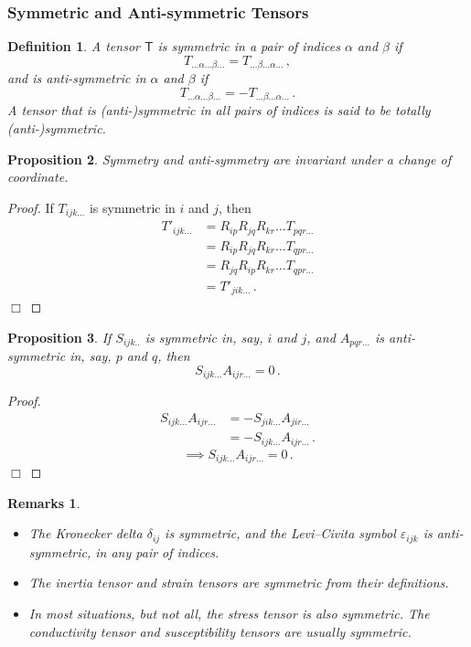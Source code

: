 \documentclass{article}
\theoremstyle{plain}\theoremheaderfont{\normalfont\itshape}\theorembodyfont{\rmfamily}\theoremseparator{.}\newtheorem*{rem}{Remark}\newtheorem*{ex}{Example}\newtheorem*{proof}{Proof}\newtheorem*{altp}{Alternative proof}
\theoremstyle{plain}\theoremheaderfont{\normalfont\bfseries}\theorembodyfont{\rmfamily}\theoremseparator{.}\newtheorem{thm}{Theorem}[section]\newtheorem{lem}[thm]{Lemma}\newtheorem{prop}[thm]{Proposition}\newtheorem*{cor}{Corollary}\newtheorem{defn}[thm]{Definition}\newtheorem{clm}[thm]{Claim}\newtheorem{clminproof}{Claim}
\theoremstyle{break}\theoremheaderfont{\normalfont\itshape}\theorembodyfont{\rmfamily}\theoremseparator{.\medskip}\newtheorem*{proofskip}{Proof}\newtheorem*{exs}{Examples}\newtheorem*{rems}{Remarks}
\theoremstyle{break}\theoremheaderfont{\normalfont\bfseries}\theorembodyfont{\rmfamily}\theoremseparator{.\medskip}\newtheorem{lemskip}[thm]{Lemma}\newtheorem{defnskip}[thm]{Definition}\newtheorem{propskip}[thm]{Proposition}\newtheorem{thmskip}[thm]{Theorem}
\numberwithin{equation}{section}
\newcommand{\qed}{\hfill\ensuremath{\Box}}
\begin{document}
	\subsubsection{Symmetric and Anti-symmetric Tensors}
	\begin{defn}
		A tensor \(\mathsf{T}\) is \textit{symmetric} in a pair of indices \(\alpha\) and \(\beta\) if
		\[T_{\dots\alpha\dots\beta\dots}=T_{\dots\beta\dots\alpha\dots}\,,\]
		and is \textit{anti-symmetric} in \(\alpha\) and \(\beta\) if
		\[T_{\dots\alpha\dots\beta\dots}=-T_{\dots\beta\dots\alpha\dots}\,.\]
		A tensor that is (anti-)symmetric in all pairs of indices is said to be \textit{totally (anti-)symmetric}.
	\end{defn}
	\begin{prop}
		Symmetry and anti-symmetry are invariant under a change of coordinate.
	\end{prop}
	\begin{proof}
		If \(T_{ijk\dots}\) is symmetric in \(i\) and \(j\), then
		\begin{align*}
			T'_{ijk\dots}&=R_{ip}R_{jq}R_{kr}\dots T_{pqr\dots}\\
			&=R_{ip}R_{jq}R_{kr}\dots T_{qpr\dots}\\
			&=R_{jq}R_{ip}R_{kr}\dots T_{qpr\dots}\\
			&=T'_{jik\dots}\,.
		\end{align*}\qed
	\end{proof}
	\begin{prop}
		If \(S_{ijk..}\) is symmetric in, say, \(i\) and \(j\), and \(A_{pqr\dots}\) is anti-symmetric in, say, \(p\) and \(q\), then
		\[S_{ijk\dots}A_{ijr\dots}=0\,.\]
	\end{prop}
	\begin{proof}
		\begin{align*}
			S_{ijk\dots}A_{ijr\dots}&=-S_{jik\dots}A_{jir\dots}\\
			&=-S_{ijk\dots}A_{ijr\dots}\,.
		\end{align*}
		\[\implies S_{ijk\dots}A_{ijr\dots}=0\,.\]\qed
	\end{proof}
	\begin{rems}
		\begin{itemize}[topsep=0pt]
			\item The Kronecker delta \(\delta_{ij}\) is symmetric, and the Levi--Civita symbol \(\varepsilon_{ijk}\) is anti-symmetric, in any pair of indices.
			\item The inertia tensor and strain tensors are symmetric from their definitions.
			\item In most situations, but not all, the stress tensor is also symmetric. The conductivity
			tensor and susceptibility tensors are usually symmetric.
		\end{itemize}
	\end{rems}
\end{document}
